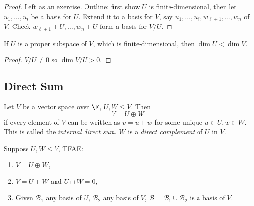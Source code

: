 \documentclass[a4paper]{article}
\newcommand*{\basis}{\mathcal}
\theoremstyle{definition}
\begin{document}
\begin{proof}
  Left as an exercise. Outline: first show \(U\) is finite-dimensional, then let \(u_1,\ldots,u_\ell\) be a basis for \(U\). Extend it to a basis for \(V\), say \(u_1,\ldots,u_\ell,w_{\ell+1},\ldots,w_n\) of \(V\). Check \(w_{\ell+1}+U,\ldots,w_n+U\) form a basis for \(V/U\).
\end{proof}

\begin{corollary}
  If \(U\) is a proper subspace of \(V\), which is finite-dimensional, then \(\dim U < \dim V\).
\end{corollary}

\begin{proof}
  \(V/U \neq 0\) so \(\dim V/U > 0\).
\end{proof}

\subsection{Direct Sum}

\begin{definition}
  Let \(V\) be a vector space over \(\F\), \(U, W\leq V\). Then
  \[
V = U \oplus W
  \]
  if every element of \(V\) can be written as \(v=u+w\) for some unique \(u\in U, w\in W\). This is called the \emph{internal direct sum}. \(W\) is a \emph{direct complement} of \(U\) in \(V\).
\end{definition}

\begin{lemma}
  Suppose \(U,W\leq V\), TFAE:
  \begin{enumerate}
  \item \(V = U \oplus W\),
  \item \(V=U+W\) and \(U\cap W = 0\),
  \item Given \(\basis B_1\) any basis of \(U\), \(\basis B_2\) any basis of \(V\), \(\basis B = \basis B_1\cup \basis B_2\) is a basis of \(V\).
  \end{enumerate}
\end{lemma}
\end{document}
